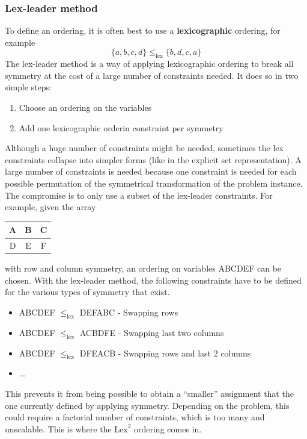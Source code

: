 \documentclass[CS4402-Notes.tex]{subfiles}
\begin{document}
\subsubsection{Lex-leader method}
To define an ordering, it is often best to use a \textbf{lexicographic} ordering, for example
\begin{equation}
\{a, b, c, d\} \leq_{\text{lex}} \{b, d, c, a\}
\end{equation}
The lex-leader method is a way of applying lexicographic ordering to break all symmetry at the cost of a large number of constraints needed. It does so in two simple steps:
\begin{enumerate}
\item Choose an ordering on the variables
\item Add one lexicographic orderin constraint per symmetry
\end{enumerate}
Although a huge number of constraints might be needed, sometimes the lex constraints collapse into simpler forms (like in the explicit set representation). A large number of constraints is needed because one constraint is needed for each possible permutation of the symmetrical transformation of the problem instance. The compromise is to only use a subset of the lex-leader constraints. For example, given the array
\begin{table}[H]
\centering
\begin{tabular}{| c | c | c |}
  \hline
  A & B & C \\
  \hline
  D & E & F \\
  \hline
\end{tabular}
\end{table}
with row and column symmetry, an ordering on variables ABCDEF can be chosen. With the lex-leader method, the following constraints have to be defined for the various types of symmetry that exist.
\begin{itemize}
\item ABCDEF $\leq_{\text{lex}}$ DEFABC - Swapping rows
\item ABCDEF $\leq_{\text{lex}}$ ACBDFE - Swapping last two columns
\item ABCDEF $\leq_{\text{lex}}$ DFEACB - Swapping rows and last 2 columns
\item ...
\end{itemize}
This prevents it from being possible to obtain a ``smaller'' assignment that the one currently defined by applying symmetry. Depending on the problem, this could require a factorial number of constraints, which is too many and unscalable. This is where the $\text{Lex}^{2}$ ordering comes in.
\end{document}
